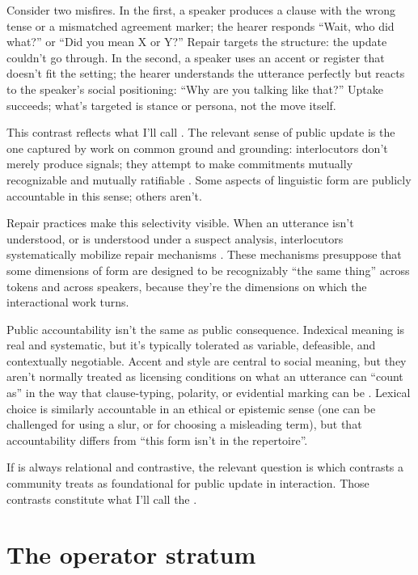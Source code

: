 \documentclass[12pt,letterpaper]{article}
\begin{document}
Consider two misfires. In the first, a speaker produces a clause with the wrong tense or a mismatched agreement marker; the hearer responds \enquote{Wait, who did what?} or \enquote{Did you mean X or Y?} Repair targets the structure: the update couldn't go through. In the second, a speaker uses an accent or register that doesn't fit the setting; the hearer understands the utterance perfectly but reacts to the speaker's social positioning: \enquote{Why are you talking like that?} Uptake succeeds; what's targeted is stance or persona, not the move itself.

This contrast reflects what I'll call . The relevant sense of public update is the one captured by work on common ground and grounding: interlocutors don't merely produce signals; they attempt to make commitments mutually recognizable and mutually ratifiable \citep{stalnaker1978,stalnaker2002,clarkbrennan1991,clark1996}. Some aspects of linguistic form are publicly accountable in this sense; others aren't.

Repair practices make this selectivity visible. When an utterance isn't understood, or is understood under a suspect analysis, interlocutors systematically mobilize repair mechanisms \citep{schegloffjeffersonsacks1977}. These mechanisms presuppose that some dimensions of form are designed to be recognizably \enquote{the same thing} across tokens and across speakers, because they're the dimensions on which the interactional work turns.

Public accountability isn't the same as public consequence. Indexical meaning is real and systematic, but it's typically tolerated as variable, defeasible, and contextually negotiable. Accent and style are central to social meaning, but they aren't normally treated as licensing conditions on what an utterance can \enquote{count as} in the way that clause-typing, polarity, or evidential marking can be \citep{eckert2008,eckert2012,agha2007,coupland2007}. Lexical choice is similarly accountable in an ethical or epistemic sense (one can be challenged for using a slur, or for choosing a misleading term), but that accountability differs from \enquote{this form isn't in the repertoire}.

If  is always relational and contrastive, the relevant question is which contrasts a community treats as foundational for public update in interaction. Those contrasts constitute what I'll call the .

\section{The operator stratum}
\end{document}
